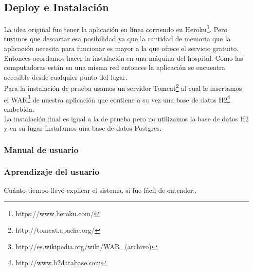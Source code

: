 \subsection{Deploy e Instalación}
La idea original fue tener la aplicación en línea corriendo en Heroku\footnote{https://www.heroku.com/}. Pero tuvimos que descartar esa posibilidad ya que la cantidad de memoria que la aplicación necesita para funcionar es mayor a la que ofrece el servicio gratuito. Entonces acordamos hacer la instalación en una máquina del hospital. Como las computadoras están en una misma red entonces la aplicación se encuentra accesible desde cualquier punto del lugar.\\
Para la instalación de prueba usamos un servidor Tomcat\footnote{http://tomcat.apache.org/} al cual le insertamos el WAR\footnote{http://es.wikipedia.org/wiki/WAR\_(archivo)} de nuestra aplicación que contiene a su vez una base de datos H2\footnote{http://www.h2database.com} embebida.\\
La instalación final es igual a la de prueba pero no utilizamos la base de datos H2 y en su lugar instalamos una base de datos Postgres.
\subsubsection{Manual de usuario}
\newpage 

\subsubsection{Aprendizaje del usuario}
Cuánto tiempo llevó explicar el sistema, si fue fácil de entender..